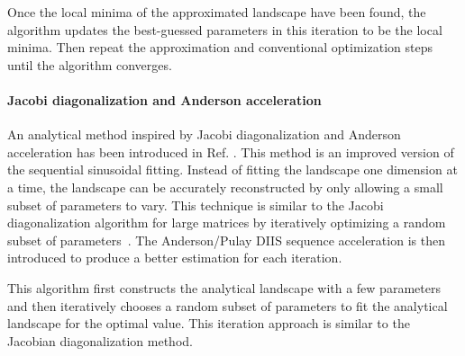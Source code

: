 Once the local minima of the approximated landscape have been found, the algorithm updates the best-guessed parameters in this iteration to be the local minima. Then repeat the approximation and conventional optimization steps until the algorithm converges.



\paragraph{Jacobi diagonalization and Anderson acceleration}

An analytical method inspired by Jacobi diagonalization and Anderson acceleration has been introduced in Ref. \cite{parrish_jacobi_2019}. This method is an improved version of the sequential sinusoidal fitting. Instead of fitting the landscape one dimension at a time, the landscape can be accurately reconstructed by only allowing a small subset of parameters to vary. This technique is similar to the Jacobi diagonalization algorithm for large matrices by iteratively optimizing a random subset of parameters~\cite{golub_eigenvalue_2000}. The Anderson/Pulay DIIS sequence acceleration is then introduced to produce a better estimation for each iteration. %

This algorithm first constructs the analytical landscape with a few parameters and then iteratively chooses a random subset of parameters to fit the analytical landscape for the optimal value. This iteration approach is similar to the Jacobian diagonalization method. 

